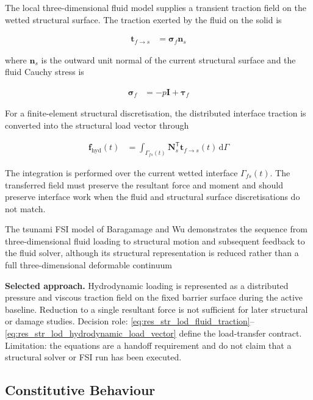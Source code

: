 The local three-dimensional fluid model supplies a transient traction field on the wetted structural surface. The traction exerted by the fluid on the solid is

\begin{align}
\bm{t}_{f\rightarrow s}
&=
\bm{\sigma}_{f}\bm{n}_{s}
\label{eq:res_str_lod_fluid_traction}
\end{align}

where \(\bm{n}_{s}\) is the outward unit normal of the current structural surface and the fluid Cauchy stress is

\begin{align}
\bm{\sigma}_{f}
&=
-p\bm{I}+\bm{\tau}_{f}
\label{eq:res_str_lod_fluid_cauchy_stress}
\end{align}

For a finite-element structural discretisation, the distributed interface traction is converted into the structural load vector through

\begin{align}
\bm{f}_{\mathrm{hyd}}(t)
&=
\int_{\Gamma_{fs}(t)}
\bm{N}_{s}^{\mathsf{T}}
\bm{t}_{f\rightarrow s}(t)
\,\mathrm{d}\Gamma
\label{eq:res_str_lod_hydrodynamic_load_vector}
\end{align}

The integration is performed over the current wetted interface \(\Gamma_{fs}(t)\). The transferred field must preserve the resultant force and moment and should preserve interface work when the fluid and structural surface discretisations do not match.

The tsunami FSI model of Baragamage and Wu demonstrates the sequence from three-dimensional fluid loading to structural motion and subsequent feedback to the fluid solver, although its structural representation is reduced rather than a full three-dimensional deformable continuum \autocite{baragamage2024fullycoupled}

\textbf{Selected approach.} Hydrodynamic loading is represented as a
distributed pressure and viscous traction field on the fixed barrier
surface during the active baseline. Reduction to a single resultant
force is not sufficient for later structural or damage studies.
Decision role: \cref{eq:res_str_lod_fluid_traction}--\cref{eq:res_str_lod_hydrodynamic_load_vector}
define the load-transfer contract. Limitation: the equations are a
handoff requirement and do not claim that a structural solver or FSI
run has been executed.

\subsection{Constitutive Behaviour}
\label{sec:res-str-lod-constitutive-behaviour}

